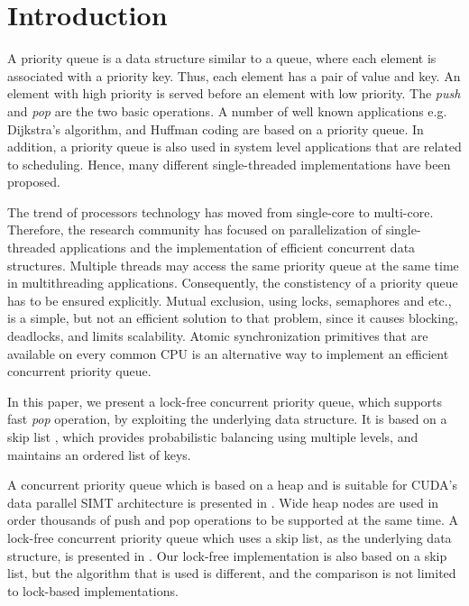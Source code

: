 \section{Introduction}\label{sec:intro}

A priority queue is a data structure similar to a queue, where each element is associated with a priority key.
Thus, each element has a pair of value and key.
An element with high priority is served before an element with low priority.
The \textit{push} and \textit{pop} are the two basic operations.
A number of well known applications e.g. Dijkstra's algorithm, and Huffman coding are based on a priority queue.
In addition, a priority queue is also used in system level applications that are related to scheduling.
Hence, many different single-threaded implementations have been proposed.

The trend of processors technology has moved from single-core to multi-core.
Therefore, the research community has focused on parallelization of single-threaded applications and the implementation of efficient concurrent data structures.
Multiple threads may access the same priority queue at the same time in multithreading applications.
Consequently, the constistency of a priority queue has to be ensured explicitly.
Mutual exclusion, using locks, semaphores and etc., is a simple, but not an efficient solution to that problem, since it causes blocking, deadlocks, and limits scalability.
Atomic synchronization primitives that are available on every common CPU is an alternative way to implement an efficient concurrent priority queue.

In this paper, we present a lock-free concurrent priority queue, which supports fast \textit{pop} operation, by exploiting the underlying data structure.
It is based on a skip list \cite{Pugh:1990:SLP:78973.78977}, which provides probabilistic balancing using multiple levels, and maintains an ordered list of keys.

A concurrent priority queue which is based on a heap and is suitable for CUDA's data parallel SIMT architecture is presented in \cite{DBLP:conf/hipc/HeAP12}.
Wide heap nodes are used in order thousands of push and pop operations to be supported at the same time.
A lock-free concurrent priority queue which uses a skip list, as the underlying data structure, is presented in \cite{Sundell:2005:FLC:1073765.1073770}.
Our lock-free implementation is also based on a skip list, but the algorithm that is used is different, and the comparison is not limited to lock-based implementations. 


